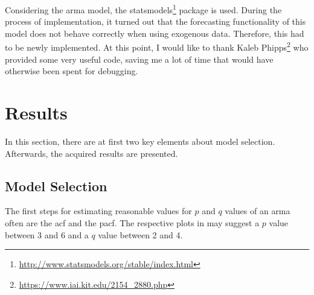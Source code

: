 Considering the \gls{arma} model, the statsmodels\footnote{\url{http://www.statsmodels.org/stable/index.html}} package is used. During the process of implementation, it turned out that the forecasting functionality of this model does not behave correctly when using exogenous data. Therefore, this had to be newly implemented. At this point, I would like to thank Kaleb Phipps\footnote{\url{https://www.iai.kit.edu/2154_2880.php}} who provided some very useful code, saving me a lot of time that would have otherwise been spent for debugging.\\


\section{Results}
\label{sec:results}

In this section, there are at first two key elements about model selection. Afterwards, the acquired results are presented.\\


\subsection*{Model Selection}

The first steps for estimating reasonable values for $p$ and $q$ values of an \gls{arma} often are the \gls{acf} and the \gls{pacf}. The respective plots in  may suggest a $p$ value between 3 and 6 and a $q$ value between 2 and 4.\\

